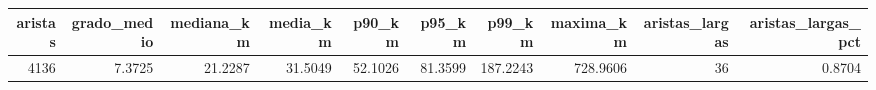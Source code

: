 \begin{tabular}{rrrrrrrrrr}
\toprule
aristas & grado\_medio & mediana\_km & media\_km & p90\_km & p95\_km & p99\_km & maxima\_km & aristas\_largas & aristas\_largas\_pct \\
\midrule
4136 & 7.3725 & 21.2287 & 31.5049 & 52.1026 & 81.3599 & 187.2243 & 728.9606 & 36 & 0.8704 \\
\bottomrule
\end{tabular}
